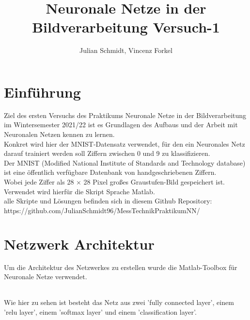 \documentclass[8pt,a4paper]{article}
\title{Neuronale Netze in der Bildverarbeitung Versuch-1}
\author{Julian Schmidt, Vincenz Forkel}
\begin{document}
\maketitle
\newpage
\tableofcontents
\newpage
\section{Einführung}
Ziel des ersten Versuchs des Praktikums Neuronale Netze in der Bildverarbeitung im Wintersemester 2021/22 ist es Grundlagen des Aufbaus und der Arbeit mit Neuronalen Netzen kennen zu lernen.\\
Konkret wird hier der MNIST-Datensatz verwendet, für den ein Neuronales Netz darauf trainiert werden soll Ziffern zwischen 0 und 9 zu klassifizieren.\\

Der MNIST (Modified National Institute of Standards and Technology database) ist eine öffentlich verfügbare Datenbank von handgeschriebenen Ziffern.\\
Wobei jede Ziffer als 28 × 28 Pixel großes Graustufen-Bild gespeichert ist.\\

Verwendet wird hierfür die Skript Sprache Matlab.\\

alle Skripte und Lösungen befinden sich in diesem Github Repository:\\
https://github.com/JulianSchmidt96/MessTechnikPraktikumNN/
\newpage
\section{Netzwerk Architektur}\label{architektur}
Um die Architektur des Netzwerkes zu erstellen wurde die Matlab-Toolbox für Neuronale Netze verwendet.


\\
Wie hier zu sehen ist besteht das Netz aus zwei 'fully connected layer', einem 'relu layer', einem 'softmax layer' und einem 'classification layer'.
\\
\\
\end{document}

